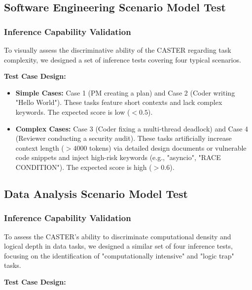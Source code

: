 \documentclass{article}
\theoremstyle{plain}
\theoremstyle{definition}
\theoremstyle{remark}
\begin{document}
\subsection{Software Engineering Scenario Model Test}

\subsubsection{Inference Capability Validation}
To visually assess the discriminative ability of the CASTER regarding task complexity, we designed a set of inference tests covering four typical scenarios.

\textbf{Test Case Design:}

\begin{itemize}
    \item \textbf{Simple Cases:} Case 1 (PM creating a plan) and Case 2 (Coder writing "Hello World"). These tasks feature short contexts and lack complex keywords. The expected score is low ($<0.5$).
    \item \textbf{Complex Cases:} Case 3 (Coder fixing a multi-thread deadlock) and Case 4 (Reviewer conducting a security audit). These tasks artificially increase context length ($>4000$ tokens) via detailed design documents or vulnerable code snippets and inject high-risk keywords (e.g., "asyncio", "RACE CONDITION"). The expected score is high ($>0.6$).
\end{itemize}

\subsection{Data Analysis Scenario Model Test}

\subsubsection{Inference Capability Validation}

To assess the CASTER's ability to discriminate computational density and logical depth in data tasks, we designed a similar set of four inference tests, focusing on the identification of "computationally intensive" and "logic trap" tasks.

\textbf{Test Case Design:}
\end{document}

